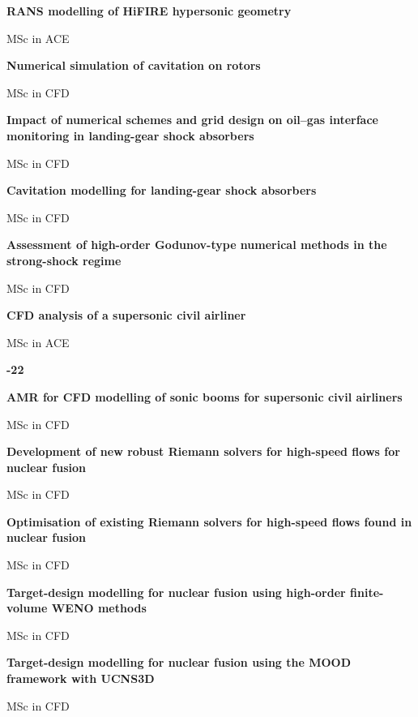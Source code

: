\documentclass[11pt,a4paper]{article}
\newlength{\cventrysep}
\newenvironment{cventry}{%
  \par\noindent\begin{minipage}{\linewidth}
  \RaggedRight\fontsize{9.8}{12.5}\selectfont
}{\end{minipage}\par\addvspace{\cventrysep}}
\newcommand{\cvtitle}[1]{{\bfseries #1\par}\vspace{1pt}}
\newcommand{\cvmeta}[1]{{\fontsize{9}{11.5}\selectfont\color{Muted}#1\par}\vspace{1pt}}
\newcommand{\cvyear}[1]{{\color{Teal}\bfseries\fontsize{11}{13}\selectfont #1\par}\vspace{6pt}}
\begin{document}
\begin{cventry}
\cvtitle{RANS modelling of HiFIRE hypersonic geometry}
\cvmeta{MSc in ACE}
\end{cventry}

\begin{cventry}
\cvtitle{Numerical simulation of cavitation on rotors}
\cvmeta{MSc in CFD}
\end{cventry}

\begin{cventry}
\cvtitle{Impact of numerical schemes and grid design on oil--gas interface monitoring in landing-gear shock absorbers}
\cvmeta{MSc in CFD}
\end{cventry}

\begin{cventry}
\cvtitle{Cavitation modelling for landing-gear shock absorbers}
\cvmeta{MSc in CFD}
\end{cventry}

\begin{cventry}
\cvtitle{Assessment of high-order Godunov-type numerical methods in the strong-shock regime}
\cvmeta{MSc in CFD}
\end{cventry}

\begin{cventry}
\cvtitle{CFD analysis of a supersonic civil airliner}
\cvmeta{MSc in ACE}
\end{cventry}

\begin{cventry}
\cvyear{2021-22}
\cvtitle{AMR for CFD modelling of sonic booms for supersonic civil airliners}
\cvmeta{MSc in CFD}
\end{cventry}

\begin{cventry}
\cvtitle{Development of new robust Riemann solvers for high-speed flows for nuclear fusion}
\cvmeta{MSc in CFD}
\end{cventry}

\begin{cventry}
\cvtitle{Optimisation of existing Riemann solvers for high-speed flows found in nuclear fusion}
\cvmeta{MSc in CFD}
\end{cventry}

\begin{cventry}
\cvtitle{Target-design modelling for nuclear fusion using high-order finite-volume WENO methods}
\cvmeta{MSc in CFD}
\end{cventry}

\begin{cventry}
\cvtitle{Target-design modelling for nuclear fusion using the MOOD framework with UCNS3D}
\cvmeta{MSc in CFD}
\end{cventry}
\end{document}
